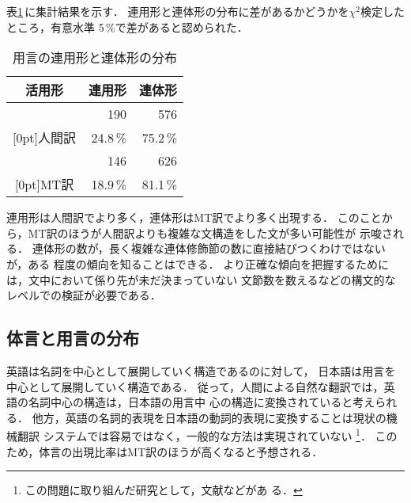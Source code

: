 表\ref{tab:yogen-katsuyo}\,に集計結果を示す．
連用形と連体形の分布に差があるかどうかを$\chi^2$検定したところ，有意水準
5\,\%で差があると認められた．
\begin{table}[htbp]
\caption{用言の連用形と連体形の分布}
\label{tab:yogen-katsuyo}
\begin{center}
\begin{tabular}{|c||r|r|}\hline
活用形 & \multicolumn{1}{|c}{連用形} & \multicolumn{1}{|c|}{連体形} \\\hline\hline  
 & 190 & 576 \\
\raisebox{1.5ex}[0pt]{人間訳} & 24.8\,\% & 75.2\,\% \\\hline
 & 146 & 626 \\
\raisebox{1.5ex}[0pt]{MT訳} & 18.9\,\% & 81.1\,\% \\\hline
\end{tabular}
\end{center}
\end{table}

連用形は人間訳でより多く，連体形はMT訳でより多く出現する．
このことから，MT訳のほうが人間訳よりも複雑な文構造をした文が多い可能性が
示唆される．
連体形の数が，長く複雑な連体修飾節の数に直接結びつくわけではないが，ある
程度の傾向を知ることはできる．
より正確な傾向を把握するためには，文中において係り先が未だ決まっていない
文節数を数える\cite{Murata99}などの構文的なレベルでの検証が必要である．


\subsection{体言と用言の分布}
\label{sec:result:pos-ratio}

英語は名詞を中心として展開していく構造であるのに対して，
日本語は用言を中心として展開していく構造である\cite{Yanabu79}．
従って，人間による自然な翻訳では，英語の名詞中心の構造は，日本語の用言中
心の構造に変換されていると考えられる．
他方，英語の名詞的表現を日本語の動詞的表現に変換することは現状の機械翻訳
システムでは容易ではなく，一般的な方法は実現されていない
\footnote{この問題に取り組んだ研究として，文献\cite{Yoshimi01b}などがあ
る．}．
このため，体言の出現比率はMT訳のほうが高くなると予想される．

